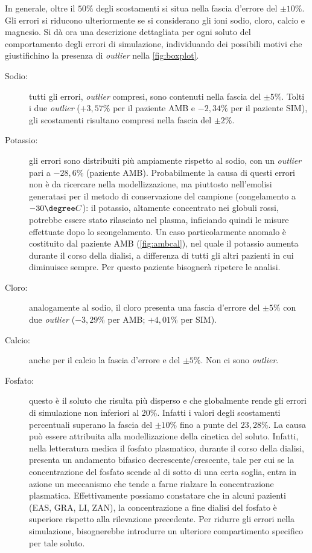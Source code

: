 In generale, oltre il $50\%$ degli scostamenti si situa nella fascia d'errore del $\pm 10\%$. Gli errori si riducono ulteriormente se si considerano gli ioni sodio, cloro, calcio e magnesio. Si dà ora una descrizione dettagliata per ogni soluto del comportamento degli errori di simulazione, individuando dei possibili motivi che giustifichino la presenza di \textit{outlier} nella \figurename\ref{fig:boxplot}.

\begin{description}
	\item[Sodio:] tutti gli errori, \textit{outlier} compresi, sono contenuti nella fascia del $\pm 5\%$. Tolti i due \textit{outlier} ($+3,57\%$ per il paziente AMB e $-2,34\%$ per il paziente SIM), gli scostamenti risultano compresi nella fascia del $\pm 2\%$.
	\item[Potassio:] gli errori sono distribuiti più ampiamente rispetto al sodio, con un \textit{outlier} pari a $-28,6\%$ (paziente AMB). Probabilmente la causa di questi errori non è da ricercare nella modellizzazione, ma piuttosto nell'emolisi generatasi per il metodo di conservazione del campione (congelamento a $-30\degree C$): il potassio, altamente concentrato nei globuli rossi, potrebbe essere stato rilasciato nel plasma, inficiando quindi le misure effettuate dopo lo scongelamento. Un caso particolarmente anomalo è costituito dal paziente AMB (\figurename\ref{fig:ambcal}), nel quale il potassio aumenta durante il corso della dialisi, a differenza di tutti gli altri pazienti in cui diminuisce sempre. Per questo paziente bisognerà ripetere le analisi.
	\item[Cloro:] analogamente al sodio, il cloro presenta una fascia d'errore del $\pm 5\%$ con due \textit{outlier} ($-3,29\%$ per AMB; $+4,01\%$ per SIM).
	\item[Calcio:] anche per il calcio la fascia d'errore e del $\pm 5\%$. Non ci sono \textit{outlier}.
	\item[Fosfato:] questo è il soluto che risulta più disperso e che globalmente rende gli errori di simulazione non inferiori al $20\%$. Infatti i valori degli scostamenti percentuali superano la fascia del $\pm 10\%$ fino a punte del $23,28\%$. La causa può essere attribuita alla modellizazione della cinetica del soluto. Infatti, nella letteratura medica \cite{bib:fosfato} il fosfato plasmatico, durante il corso della dialisi, presenta un andamento bifasico decrescente/crescente, tale per cui se la concentrazione del fosfato scende al di sotto di una certa soglia, entra in azione un meccanismo che tende a farne rialzare la concentrazione plasmatica. Effettivamente possiamo constatare che in alcuni pazienti (EAS, GRA, LI, ZAN), la concentrazione a fine dialisi del fosfato è superiore rispetto alla rilevazione precedente. Per ridurre gli errori nella simulazione, bisognerebbe introdurre un ulteriore compartimento specifico per tale soluto.

\end{description}
